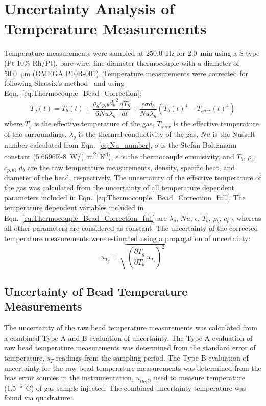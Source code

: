 \documentclass[12pt]{article}
\begin{document}
\pagebreak

\section{Uncertainty Analysis of Temperature Measurements}\label{sec:Uncertainty_Temperature_Measurements}

Temperature measurements were sampled at \SI{250.0}{Hz} for \SI{2.0}{min} using a S-type (Pt 10\% Rh/Pt), bare-wire, fine diameter thermocouple with a diameter of \SI{50.0}{\micro\metre} (OMEGA P10R-001). Temperature measurements were corrected for following Shassix's method~\cite{Shaddix1999} and using Eqn.~\ref{eq:Thermocouple_Bead_Correction}:
\begin{equation}\label{eq:Thermocouple_Bead_Correction_full}
{T_{g}(t)}= T_{b}(t)+{\frac{\rho_{b}c_{p,b}{d_{b}}^2}{6Nu\lambda_{g}}}\frac{dT_{b}}{dt}+\frac{\epsilon\sigma d_{b}}{Nu \lambda_{g}}\left({T_{b}(t)}^4-{T_{surr}(t)}^4\right)
\end{equation}
where $T_{g}$ is the effective temperature of the gas, $T_{surr}$ is the effective temperature of the surroundings, $\lambda_{g}$ is the thermal conductivity of the gas, $Nu$ is the Nusselt number calculated from Eqn.~\ref{eq:Nu_number}, $\sigma$ is the Stefan-Boltzmann constant (\SI{5.6696E-8}{W/(m^2~K^4}), $\epsilon$ is the thermocouple emmisivity, and $T_{b}$, $\rho_{b}$, $c_{p,b}$, $d_{b}$ are the raw temperature measurements, density, specific heat, and diameter of the bead, respectively. The uncertainty of the effective temperature of the gas was calculated from the uncertainty of all temperature dependent parameters included in Eqn.~\ref{eq:Thermocouple_Bead_Correction_full}. The temperature dependent variables included in Eqn.~\ref{eq:Thermocouple_Bead_Correction_full} are $\lambda_{g}$, $Nu$, $\epsilon$, $T_{b}$, $\rho_{b}$, $c_{p,b}$ whereas all other parameters are considered as constant. The uncertainty of the corrected temperature measurements were estimated using a propagation of uncertainty:
 \begin{equation}
\label{eq:temperature_corr_uncer}
u_{\scriptscriptstyle T_{g}} = \sqrt{{\left(\frac{\partial T_{g}}{\partial T_{b}}\,u_{\scriptscriptstyle T_{b}} \right)}^2}
\end{equation}

\subsection{Uncertainty of Bead Temperature Measurements}
\label{ssec:Uncertain_Bead_Temp_Measurements}
The uncertainty of the raw bead temperature measurements was calculated from a combined Type A and B evaluation of uncertainty. The Type A evaluation of raw bead temperature measurements was determined from the standard error of temperature, $s_{T}$ readings from the sampling period. The Type B evaluation of uncertainty for the raw bead temperature measurements was determined from the bias error sources in the instrumentation, $u_{inst}$, used to measure temperature (\SI{1.5}{\degree C}) of gas sample injected. The combined uncertainty temperature was found via quadrature:
\end{document}
